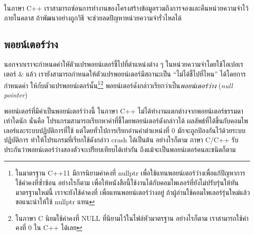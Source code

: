 ใน{\wbr}ภาษา C++
เรา{\wbr}สามารถ{\wbr}ซ่อน{\wbr}การ{\wbr}ทำงาน{\wbr}ของ{\wbr}โครงสร้าง{\wbr}ข้อมูล{\wbr}รวม{\wbr}ถึง{\wbr}การ{\wbr}จอง{\wbr}และ{\wbr}คืน{\wbr}หน่วย{\wbr}ความ{\wbr}จำ{\wbr}ไว้{\wbr}ภายใน{\wbr}คลาส{\wbr}
ถ้า{\wbr}พัฒนา{\wbr}อย่าง{\wbr}ถูก{\wbr}วิธี จะ{\wbr}ช่วย{\wbr}ลด{\wbr}ปัญหา{\wbr}หน่วย{\wbr}ความ{\wbr}จำ{\wbr}รั่วไหล{\wbr}ได้{\wbr}

\subsection{พอยน์เตอร์{\wbr}ว่าง}
นอกจาก{\wbr}เรา{\wbr}จะ{\wbr}กำหนด{\wbr}ค่า{\wbr}ใหัตัว{\wbr}แปร{\wbr}พอยน์เตอร์{\wbr}ชี้{\wbr}ไป{\wbr}ที่{\wbr}ตำแหน่ง{\wbr}ต่าง ๆ
ใน{\wbr}หน่วย{\wbr}ความ{\wbr}จำ{\wbr}โดย{\wbr}ใช้{\wbr}โอเปอเรเตอร์ {\ct\&} แล้ว{\wbr}
เรา{\wbr}ยัง{\wbr}สามารถ{\wbr}กำหนด{\wbr}ให้{\wbr}ตัวแปร{\wbr}พอยน์เตอร์{\wbr}มี{\wbr}สถานะ{\wbr}เป็น ``ไม่{\wbr}ได้{\wbr}ชี้{\wbr}ไป{\wbr}ที่ไหน''
ได้{\wbr}โดย{\wbr}การ{\wbr}กำหนด{\wbr}ค่า {} ให้{\wbr}กับ{\wbr}ตัวแปร{\wbr}พอยน์เตอร์{\wbr}นั้น\footnote{ใน{\wbr}มาตรฐาน C++11
  มี{\wbr}การ{\wbr}นิยาม{\wbr}ค่า{\wbr}คงที่ {\ct nullptr}
  เพื่อ{\wbr}ใช้{\wbr}แทน{\wbr}พอยน์เตอร์{\wbr}ว่าง{\wbr}เพื่อ{\wbr}แก้{\wbr}ปัญหา{\wbr}การ{\wbr}ใช้{\wbr}ค่า{\wbr}คงที่{\wbr}ซ้ำซ้อน อย่างไร{\wbr}ก็{\wbr}ตาม{\wbr}
  เพื่อ{\wbr}ให้{\wbr}หนังสือ{\wbr}นี้{\wbr}ใช้งาน{\wbr}ได้{\wbr}กับ{\wbr}คอมไพเลอร์{\wbr}ที่{\wbr}ยัง{\wbr}ไม่{\wbr}ปรับ{\wbr}รุ่น{\wbr}ให้{\wbr}ทัน{\wbr}มาตรฐาน{\wbr}ใหม่{\wbr}นี้{\wbr}
  เรา{\wbr}จะ{\wbr}ยัง{\wbr}ใช้{\wbr}ค่า{\wbr}คงที่ {} เพื่อ{\wbr}แทน{\wbr}พอยน์เตอร์{\wbr}ว่าง{\wbr}อยู่ ถ้า{\wbr}ผู้{\wbr}อ่าน{\wbr}ใช้{\wbr}คอมไพเลอร์{\wbr}รุ่น{\wbr}ใหม่{\wbr}แล้ว{\wbr}
  ขอ{\wbr}แนะนำ{\wbr}ให้{\wbr}ใช้ {\ct nullptr} แทน {}}\footnote{ใน{\wbr}ภาษา C นิยม{\wbr}ใช้{\wbr}ค่า{\wbr}คงที่{\wbr}
  {\ct NULL} ที่{\wbr}นิยาม{\wbr}ไว้{\wbr}ใน{\wbr}ไฟล์{\wbr}หัว{\wbr}มาตรฐาน อย่างไร{\wbr}ก็{\wbr}ตาม เรา{\wbr}สามารถ{\wbr}ใช้{\wbr}ค่า{\wbr}คงที่ 0 ใน{\wbr}
  C++ ได้{\wbr}เลย} พอยน์เตอร์ดัง{\wbr}กล่าว{\wbr}เรียก{\wbr}ว่า{\wbr}เป็น{\em พอยน์เตอร์ว่าง} ({\em null
  pointer})

พอยน์เตอร์ที่{\wbr}มี{\wbr}ค่า{\wbr}เป็น{\wbr}พอยน์เตอร์{\wbr}ว่าง{\wbr}นี้ ใน{\wbr}ภาษา C++
ไม่{\wbr}ได้{\wbr}ทำงาน{\wbr}แตก{\wbr}ต่าง{\wbr}จาก{\wbr}พอยน์เตอร์{\wbr}ธรรมดา{\wbr}เท่าใด{\wbr}นัก นั่น{\wbr}คือ{\wbr}
โปรแกรม{\wbr}สามารถ{\wbr}เรียกหา{\wbr}ค่า{\wbr}ที่{\wbr}ชี้{\wbr}โดย{\wbr}พอยน์เตอร์{\wbr}ดัง{\wbr}กล่าว{\wbr}ได้{\wbr}
ผลลัพธ์{\wbr}ที่{\wbr}ได้{\wbr}ขึ้น{\wbr}กับ{\wbr}คอมไพเลอร์{\wbr}และ{\wbr}ระบบ{\wbr}ปฏิบัติการ{\wbr}ที่{\wbr}ใช้ แต่{\wbr}โดย{\wbr}ทั่วไป{\wbr}การ{\wbr}เรียก{\wbr}อ่าน{\wbr}ค่า{\wbr}ตำแหน่ง{\wbr}ที่ 0
มัก{\wbr}จะ{\wbr}ถูก{\wbr}ป้องกัน{\wbr}ไว้{\wbr}ด้วย{\wbr}ระบบ{\wbr}ปฏิบัติการ ทำให้{\wbr}โปรแกรม{\wbr}ที่{\wbr}เรียก{\wbr}ใช้{\wbr}ดัง{\wbr}กล่าว crash ได้{\wbr}เป็นต้น{\wbr}
อย่างไร{\wbr}ก็{\wbr}ตาม ภาษา C/C++ รับประกัน{\wbr}ว่า{\wbr}พอยน์เตอร์{\wbr}ว่าง{\wbr}สอง{\wbr}ตัว{\wbr}จะ{\wbr}เปรียบเทียบ{\wbr}ได้{\wbr}เท่า{\wbr}กัน{\wbr}
ถึง{\wbr}แม้{\wbr}จะ{\wbr}เป็น{\wbr}พอยน์เตอร์{\wbr}คน{\wbr}ละ{\wbr}ชนิด{\wbr}ก็{\wbr}ตาม{\wbr}


